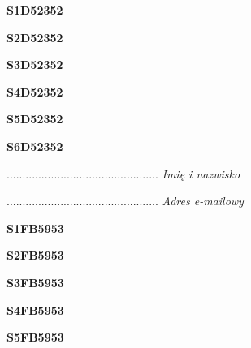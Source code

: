 \begin{turn}{90}\huge \textbf{S1D52352}\end{turn}

\begin{turn}{90}\huge \textbf{S2D52352}\end{turn}

\begin{turn}{90}\huge \textbf{S3D52352}\end{turn}

\begin{turn}{90}\huge \textbf{S4D52352}\end{turn}

\begin{turn}{90}\huge \textbf{S5D52352}\end{turn}

\begin{turn}{90}\huge \textbf{S6D52352}\end{turn}

\begin{turn}{90}\begin{minipage}{\linewidth} \vspace{20mm} ................................................  \textit{Imię i nazwisko}\end{minipage}\end{turn}

\begin{turn}{90}\begin{minipage}{\linewidth} \vspace{20mm} ................................................  \textit{Adres e-mailowy}\end{minipage}\end{turn}

\begin{turn}{90}\huge \textbf{S1FB5953}\end{turn}

\begin{turn}{90}\huge \textbf{S2FB5953}\end{turn}

\begin{turn}{90}\huge \textbf{S3FB5953}\end{turn}

\begin{turn}{90}\huge \textbf{S4FB5953}\end{turn}

\begin{turn}{90}\huge \textbf{S5FB5953}\end{turn}

